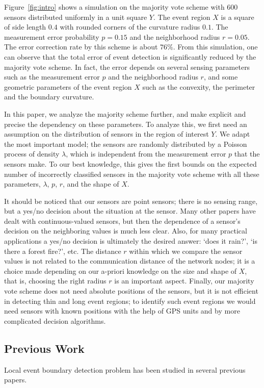\documentclass{article}
\begin{document}
\par
Figure~\ref{fig:intro} shows a simulation on the majority vote scheme
with $600$ sensors distributed uniformly in a unit square $Y$. The
event region $X$ is a square of side length $0.4$ with rounded corners of the curvature radius $0.1$. The measurement error probability $p = 0.15$ and the neighborhood radius $r=0.05$. The error correction rate by this scheme is about $76\%$.
From this simulation, one can observe that the total error of event
detection is significantly reduced by the majority vote scheme. In fact,
the error depends on several sensing parameters such as the measurement
error $p$ and the neighborhood radius $r$, and some geometric parameters
of the event region $X$ such as the convexity, the perimeter and the
boundary curvature.

In this paper, we analyze the majority scheme
further, and make explicit and precise the dependency on these parameters. To analyze this, we first need an assumption on the distribution of sensors in the region of interest $Y$. We adapt the most important model; the sensors are randomly distributed by a Poisson process of density $\lambda$, which is independent from the measurement error $p$ that the sensors make. To our best knowledge, this gives the first bounds on the expected number of incorrectly classified sensors in the majority vote scheme with all these parameters, $\lambda$, $p$, $r$, and the shape of $X$.

\par
It should be noticed that our sensors are point sensors; there is
no sensing range, but a yes/no decision about the situation at the sensor.
Many other papers have dealt with continuous-valued sensors, but then the dependence of a sensor's decision on the neighboring values is much less clear. Also, for many practical applications a yes/no decision is ultimately the
desired answer: `does it rain?', `is there a forest fire?', etc.
The distance $r$ within which we compare the sensor values is
not related to the communication distance of the network nodes;
it is a choice made depending on our a-priori knowledge on the
size and shape of $X$, that is, choosing the right radius $r$ is an important aspect.
Finally, our majority vote scheme does not need absolute positions
of the sensors, but it is not efficient in detecting thin and long event regions; to identify such event regions we would need sensors with
known positions with the help of GPS units and by more complicated decision algorithms.

\subsection{Previous Work}
Local event boundary detection problem has been studied in several previous papers.
\end{document}
